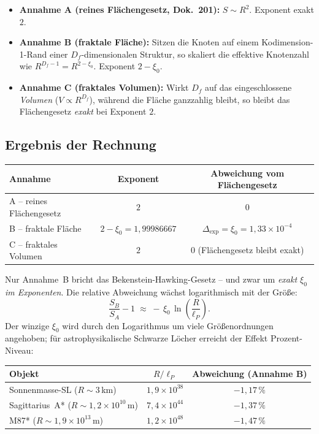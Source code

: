 \begin{itemize}
  \item \textbf{Annahme A (reines Flächengesetz, Dok.~201):}
        $S \sim R^{2}$. Exponent exakt $2$.
  \item \textbf{Annahme B (fraktale Fläche):} Sitzen die Knoten auf einem
        Kodimension-1-Rand einer $D_f$-dimensionalen Struktur, so skaliert
        die effektive Knotenzahl wie $R^{D_f - 1} = R^{2-\xi_0}$.
        Exponent $2 - \xi_0$.
  \item \textbf{Annahme C (fraktales Volumen):} Wirkt $D_f$ auf das
        eingeschlossene \emph{Volumen} ($V \propto R^{D_f}$), während die
        Fläche ganzzahlig bleibt, so bleibt das Flächengesetz
        \emph{exakt} bei Exponent $2$.
\end{itemize}

\subsection*{Ergebnis der Rechnung}

\begin{center}
\begin{tabular}{lcc}
\toprule
Annahme & Exponent & Abweichung vom Flächengesetz \\
\midrule
A -- reines Flächengesetz & $2$ & $0$ \\
B -- fraktale Fläche      & $2 - \xi_0 = 1{,}99986667$ & $\Delta_{\text{exp}} = \xi_0 = 1{,}33\times10^{-4}$ \\
C -- fraktales Volumen    & $2$ & $0$ (Flächengesetz bleibt exakt) \\
\bottomrule
\end{tabular}
\end{center}

\medskip

\noindent
Nur Annahme~B bricht das Bekenstein-Hawking-Gesetz -- und zwar um
\emph{exakt $\xi_0$ im Exponenten}. Die relative Abweichung wächst
logarithmisch mit der Größe:
\[
\frac{S_B}{S_A} - 1 \;\approx\; -\,\xi_0 \,\ln\!\left(\frac{R}{\ell_P}\right).
\]
Der winzige $\xi_0$ wird durch den Logarithmus um viele Größenordnungen
angehoben; für astrophysikalische Schwarze Löcher erreicht der Effekt
Prozent-Niveau:

\begin{center}
\begin{tabular}{lcc}
\toprule
Objekt & $R/\ell_P$ & Abweichung (Annahme B) \\
\midrule
Sonnenmasse-SL ($R\sim 3$\,km)        & $1{,}9\times10^{38}$ & $-1{,}17\,\%$ \\
Sagittarius~A* ($R\sim 1{,}2\times10^{10}$\,m) & $7{,}4\times10^{44}$ & $-1{,}37\,\%$ \\
M87* ($R\sim 1{,}9\times10^{13}$\,m)  & $1{,}2\times10^{48}$ & $-1{,}47\,\%$ \\
\bottomrule
\end{tabular}
\end{center}

